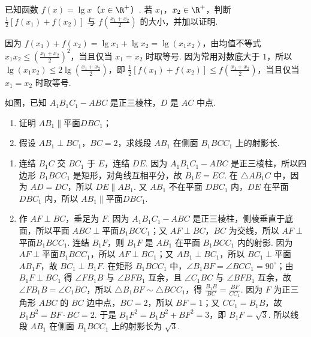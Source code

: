 \begin{problem}
已知函数 \(f(x)=\lg x\)（\(x\in\R^{+}\)）. 若 \(x_{1}\)，\(x_{2}\in\R^{+}\)，判断 \(\frac{1}{2}\left[f\left(x_{1}\right)+f\left(x_{2}\right)\right]\) 与 \(f\left(\frac{x_{1}+x_{2}}{2}\right)\) 的大小，并加以证明.
\end{problem}

\begin{solution}
因为 \(f\left(x_{1}\right)+f\left(x_{2}\right)=\lg x_{1}+\lg x_{2}=\lg\left(x_{1}x_{2}\right)\)，由均值不等式 \(x_{1}x_{2}\leq\left(\frac{x_{1}+x_{2}}{2}\right)^{2}\)，当且仅当 \(x_{1}=x_{2}\) 时取等号. 因为常用对数底大于 \(1\)，所以 \(\lg\left(x_{1}x_{2}\right)\leq 2\lg\left(\frac{x_{1}+x_{2}}{2}\right)\)，即 \(\frac{1}{2}\left[f\left(x_{1}\right)+f\left(x_{2}\right)\right]\leq f\left(\frac{x_{1}+x_{2}}{2}\right)\)，当且仅当 \(x_{1}=x_{2}\) 时取等号.
\end{solution}

\begin{problem}
如图，已知 \(A_{1}B_{1}C_{1}-ABC\) 是正三棱柱，\(D\) 是 \(AC\) 中点.
\begin{enumerate}
\item 证明 \(AB_{1}\parallel\)平面\(DBC_{1}\)；
\item 假设 \(AB_{1}\perp BC_{1}\)，\(BC=2\)，求线段 \(AB_{1}\) 在侧面 \(B_{1}BCC_{1}\) 上的射影长.
\end{enumerate}
\end{problem}

\begin{solution}
\begin{enumerate}
\item 连结 \(B_{1}C\) 交 \(BC_{1}\) 于 \(E\)，连结 \(DE\). 因为 \(A_{1}B_{1}C_{1}-ABC\) 是正三棱柱，所以四边形 \(B_{1}BCC_{1}\) 是矩形，对角线互相平分，故 \(B_{1}E=EC\). 在 \(\triangle AB_{1}C\) 中，因为 \(AD=DC\)，所以 \(DE\parallel AB_{1}\). 又 \(AB_{1}\) 不在平面 \(DBC_{1}\) 内，\(DE\) 在平面 \(DBC_{1}\) 内，所以 \(AB_{1}\parallel\)平面\(DBC_{1}\).
\item 作 \(AF\perp BC\)，垂足为 \(F\). 因为 \(A_{1}B_{1}C_{1}-ABC\) 是正三棱柱，侧棱垂直于底面，所以平面 \(ABC\perp\)平面\(B_{1}BCC_{1}\)；又 \(AF\perp BC\)，\(BC\) 为交线，所以 \(AF\perp\)平面\(B_{1}BCC_{1}\). 连结 \(B_{1}F\)，则 \(B_{1}F\) 是 \(AB_{1}\) 在平面 \(B_{1}BCC_{1}\) 内的射影. 因为 \(AF\perp\)平面\(B_{1}BCC_{1}\)，所以 \(AF\perp BC_{1}\)；又 \(AB_{1}\perp BC_{1}\)，所以 \(BC_{1}\perp\)平面\(AB_{1}F\)，故 \(BC_{1}\perp B_{1}F\). 在矩形 \(B_{1}BCC_{1}\) 中，\(\angle B_{1}BF=\angle BCC_{1}=90^{\circ}\)；由 \(B_{1}F\perp BC_{1}\) 得 \(\angle FB_{1}B\) 与 \(\angle BFB_{1}\) 互余，且 \(\angle C_{1}BC\) 与 \(\angle BFB_{1}\) 互余，故 \(\angle FB_{1}B=\angle C_{1}BC\)，所以 \(\triangle B_{1}BF\sim\triangle BCC_{1}\)，得 \(\frac{B_{1}B}{BC}=\frac{BF}{CC_{1}}\). 因为 \(F\) 为正三角形 \(ABC\) 的 \(BC\) 边中点，\(BC=2\)，所以 \(BF=1\)；又 \(CC_{1}=B_{1}B\)，故 \(B_{1}B^{2}=BF\cdot BC=2\). 于是 \(B_{1}F^{2}=B_{1}B^{2}+BF^{2}=3\)，即 \(B_{1}F=\sqrt{3}\). 所以线段 \(AB_{1}\) 在侧面 \(B_{1}BCC_{1}\) 上的射影长为 \(\sqrt{3}\).
\end{enumerate}
\end{solution}

